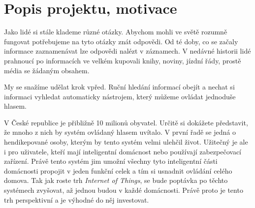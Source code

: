 \documentclass[12pt,a4paper]{article}
\begin{document}
\newpage
\pagestyle{plain}     %
\setcounter{page}{1}
\addtolength{\voffset}{-3cm}
\addtolength{\headheight}{2cm}

\pagestyle{fancy}
\lfoot{}
\cfoot{\thepage}
\rfoot{}
\renewcommand{\headrulewidth}{0.4pt}


\section*{Popis projektu, motivace}
Jako lidé si stále klademe různé otázky. Abychom mohli ve světě rozumně fungovat potřebujeme na tyto otázky znát odpovědi. Od té doby, co se začaly informace zaznamenávat lze odpovědi nalézt v záznamech. V nedávné historii lidé prahnoucí po informacích ve velkém kupovali knihy, noviny, jízdní řády, prostě média se žádaným obsahem. 

My se snažíme udělat krok vpřed. Ruční hledání informací obejít a nechat si informaci vyhledat automaticky nástrojem, který můžeme ovládat jednoduše hlasem.

V České republice je přibližně 10 milionů obyvatel. Určitě si dokážete představit, že mnoho z nich by systém ovládaný hlasem uvítalo. V první řadě se jedná o hendikepované osoby, kterým by tento systém velmi ulehčil život. Užitečný je ale i pro uživatele, kteří mají inteligentní domácnost nebo používají zabezpečovací zařízení. Právě tento systém jim umožní všechny tyto inteligentní části domácnosti propojit v jeden funkční celek a tím si usnadnit ovládání celého domova. Tak jak roste trh \textit{Internet of Things}, se bude poptávka po těchto systémech zvyšovat, až jednou budou v každé domácnosti. Právě proto je tento trh perspektivní a je výhodné do něj investovat.
\end{document}
